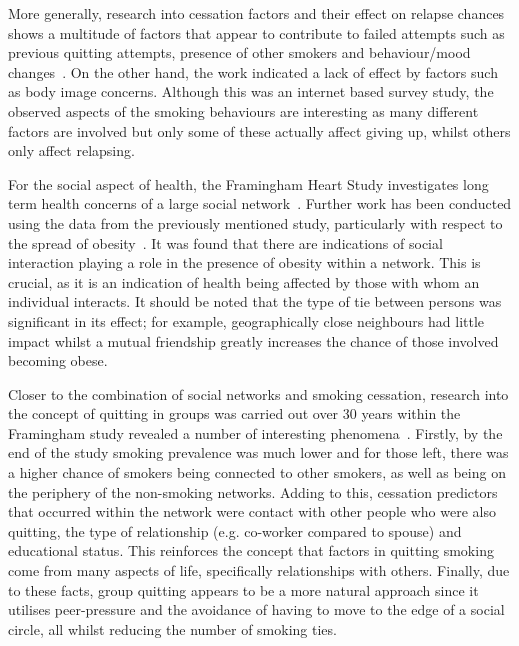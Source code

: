 \documentclass[]{report}
\begin{document}
More generally, research into cessation factors and their effect on relapse chances shows a multitude of factors that appear to contribute to failed attempts such as previous quitting attempts, presence of other smokers and behaviour/mood changes~\cite{UCL-cess}. On the other hand, the work indicated a lack of effect by factors such as body image concerns. Although this was an internet based survey study, the observed aspects of the smoking behaviours are interesting as many different factors are involved but only some of these actually affect giving up, whilst others only affect relapsing.

For the social aspect of health, the Framingham Heart Study investigates long term health concerns of a large social network~\cite{framingham}. Further work has been conducted using the data from the previously mentioned study, particularly with respect to the spread of obesity~\cite{obPap}. It was found that there are indications of social interaction playing a role in the presence of obesity within a network. This is crucial, as it is an indication of health being affected by those with whom an individual interacts. It should be noted that the type of tie between persons was significant in its effect; for example, geographically close neighbours had little impact whilst a mutual friendship greatly increases the chance of those involved becoming obese.

Closer to the combination of social networks and smoking cessation, research into the concept of quitting in groups was carried out over 30 years within the Framingham study revealed a number of interesting phenomena~\cite{droves}. Firstly, by the end of the study smoking prevalence was much lower and for those left, there was a higher chance of smokers being connected to other smokers, as well as being on the periphery of the non-smoking networks. Adding to this, cessation predictors that occurred within the network were contact with other people who were also quitting, the type of relationship (e.g. co-worker compared to spouse) and educational status. This reinforces the concept that factors in quitting smoking come from many aspects of life, specifically relationships with others. Finally, due to these facts, group quitting appears to be a more natural approach since it utilises peer-pressure and the avoidance of having to move to the edge of a social circle, all whilst reducing the number of smoking ties.
\end{document}
